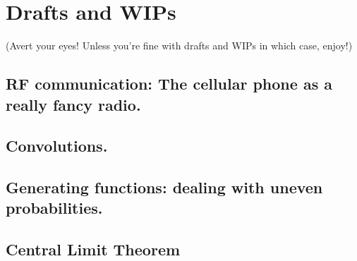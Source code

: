 \documentclass[../main/main.tex]{subfiles}
\begin{document}
\chapter{Drafts and WIPs}\label{drafts-and-wips}

(Avert your eyes! Unless you're fine with drafts and WIPs \textemdash{} in which case, enjoy!)

\section{RF communication: The cellular phone as a really fancy radio.}



\section{Convolutions.}

\section{Generating functions: dealing with uneven probabilities.}\label{sec:generating-functions} %














\section{Central Limit Theorem} %


\end{document}

